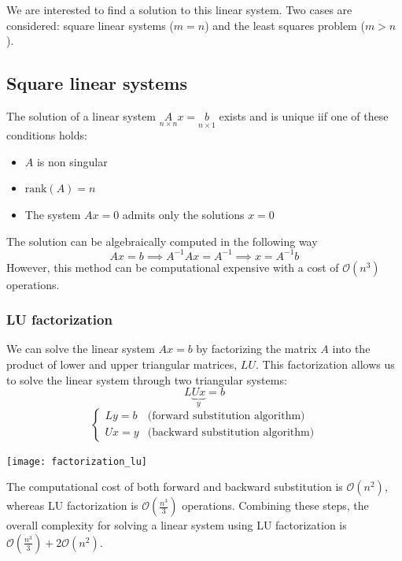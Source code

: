 \documentclass{article}
\begin{document}
We are interested to find a solution to this linear system. Two cases are
considered: square linear systems ($m=n$) and the least squares problem
($m>n$). 
\subsection{Square linear systems}
\begin{proposition}
    The solution of a linear system $\underset{n\times n}Ax=\underset{n\times
    1}b$ exists and is unique iif one of these conditions holds:
    \begin{itemize}
        \item $A$ is non singular 
        \item $\text{rank}(A)=n$
        \item The system $Ax=0$ admits only the solutions $x=0$
    \end{itemize}
\end{proposition}
The solution can be algebraically computed in the following way 
$$Ax=b\implies A^{-1}Ax=A^{-1}\implies x=A^{-1}b$$
However, this method can be computational expensive with a cost of
$\mathcal{O}(n^3)$ operations.
\subsubsection{LU factorization}
We can solve the linear system $Ax=b$ by factorizing the matrix $A$ into the
product of lower and upper triangular matrices, $LU$. This factorization
allows us to solve the linear system through two triangular systems:
$$L\underbrace{Ux}_{y}=b$$
$$\begin{cases}
    Ly=b & \text{(forward substitution algorithm)}\\
    Ux=y & \text{(backward substitution algorithm)}
\end{cases}$$
\begin{center}
    \texttt{[image: factorization\_lu]}
\end{center}
The computational cost of both forward and backward substitution is
$\mathcal{O}(n^2)$, whereas LU factorization is $\mathcal{O}(\frac{n^3}{3})$
operations. Combining these steps, the overall complexity for solving a linear
system using LU factorization is $\mathcal{O}(\frac{n^3}{3})+
2\mathcal{O}(n^2)$. 
\end{document}

